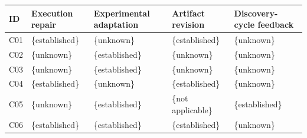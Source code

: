 \begin{tabular}{lp{.20\linewidth}p{.20\linewidth}p{.20\linewidth}p{.20\linewidth}}
\toprule
ID & Execution repair & Experimental adaptation & Artifact revision & Discovery-cycle feedback \\
\midrule
C01 & \{established\} & \{unknown\} & \{established\} & \{unknown\} \\
C02 & \{unknown\} & \{established\} & \{unknown\} & \{unknown\} \\
C03 & \{unknown\} & \{established\} & \{unknown\} & \{unknown\} \\
C04 & \{established\} & \{unknown\} & \{established\} & \{unknown\} \\
C05 & \{unknown\} & \{established\} & \{not applicable\} & \{established\} \\
C06 & \{established\} & \{established\} & \{established\} & \{unknown\} \\
\bottomrule
\end{tabular}
